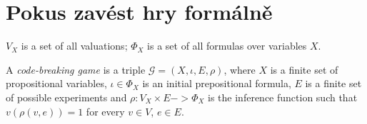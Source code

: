 \chapter{Pokus zavést hry formálně}

\renewcommand{\|}{\;|\;}

\newcommand{\game}{\mathcal{G}}

\newcommand{\Var}{X}
\newcommand{\initformula}{\iota}
\newcommand{\Val}{V}
\newcommand{\val}{v}
\renewcommand{\Form}{\Phi}
\newcommand{\form}{\phi}
\newcommand{\emptyform}{\eps}

\newcommand{\Exp}{E}
\renewcommand{\exp}{e}

\newcommand{\result}{\rho}

\newcommand{\hist}{\pi}
\newcommand{\histstg}[2]{\hist^{#1,#2}}

\newcommand{\stg}{\sigma}
\newcommand{\len}{\lambda}
\newcommand{\lenstg}[2]{\len^{#1,#2}}
\newcommand{\lenmax}[1]{\len^{#1}_\textrm{max}}
\newcommand{\lenexp}[1]{\len^{#1}_\textrm{exp}}

\newcommand{\exactly}[1]{\textrm{Exactly-#1}\:}
\newcommand{\atleast}[1]{\textrm{AtLeast-#1}\:}
\newcommand{\atmost}[1]{\textrm{AtMost-#1}\:}

$\Val_\Var$ is a set of all valuations; $\Form_\Var$ is a set of all formulas over variables $\Var$.

\begin{definition}
A \emph{code-breaking game} is a triple 
 $\game = (\Var, \initformula, \Exp, \result)$, where 
 $\Var$ is a finite set of propositional variables, 
 $\initformula \in \Form_\Var$ is an initial prepositional formula, 
 $\Exp$ is a finite set of possible experiments and
 $\result: \Val_\Var \times \Exp -> \Form_\Var $ is the inference function such that
 $\val(\result(\val, \exp)) = 1$ for every $\val\in\Val$, $\exp\in\Exp$.
\end{definition}


